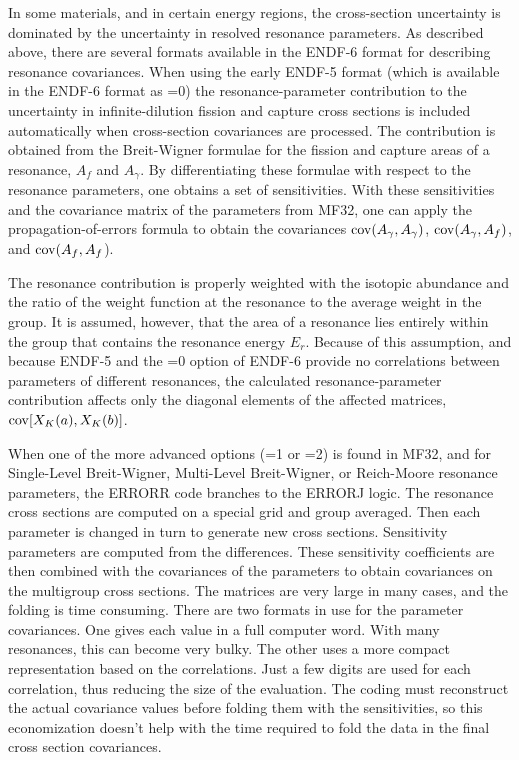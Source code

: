 In some materials, and in certain energy regions, the cross-section
uncertainty is dominated by the uncertainty in resolved resonance
parameters.  As described above, there are several formats available
in the ENDF-6 format for describing resonance covariances.  When using
the early ENDF-5 format (which is available in the ENDF-6 format as
=0) the resonance-parameter contribution to the uncertainty
in infinite-dilution fission and capture cross sections is included
automatically when cross-section covariances are processed.  The
contribution is obtained from the Breit-Wigner formulae for the
fission and capture areas of a resonance, $A_f$ and $A_{\gamma}$.
By differentiating these formulae with respect to the resonance
parameters, one obtains a set of sensitivities.  With these
sensitivities and the covariance matrix of the parameters from
MF32, one can apply the propagation-of-errors formula to obtain
the covariances ${\rm cov}(A_{\gamma},A_{\gamma})$,
${\rm cov}(A_{\gamma},A_f)$, and ${\rm cov}(A_f,A_f$).

The resonance contribution is properly weighted with the isotopic
abundance and the ratio of the weight function at the resonance to the
average weight in the group.  It is assumed, however, that the area of
a resonance lies entirely within the group that contains the resonance
energy $E_r$.  Because of this assumption, and because ENDF-5 and the
=0 option of ENDF-6 provide no correlations between
parameters of different resonances, the calculated resonance-parameter
contribution affects only the diagonal elements of the affected
matrices, ${\rm cov}[X_K(a),X_K(b)]$.

When one of the more advanced options (=1 or
=2) is found in MF32, and for Single-Level
Breit-Wigner,
Multi-Level Breit-Wigner,
or Reich-Moore resonance parameters, the
ERRORR code branches to the ERRORJ logic.  The resonance
cross sections are computed on a special grid and group averaged.  Then
each parameter is changed in turn to generate new cross sections.
Sensitivity parameters are computed from the differences.  These
sensitivity coefficients are then combined with the covariances of
the parameters to obtain covariances on the multigroup cross sections.
The matrices are very large in many cases, and the folding is
time consuming.  There are two formats in use for the parameter
covariances.  One gives each value in a full computer word.  With
many resonances, this can become very bulky.  The other uses a
more compact representation based on the correlations.  Just a few
digits are used for each correlation, thus reducing the size of
the evaluation.  The coding must reconstruct the actual covariance
values before folding them with the sensitivities, so this
economization doesn't help with the time required to fold the
data in the final cross section covariances.

